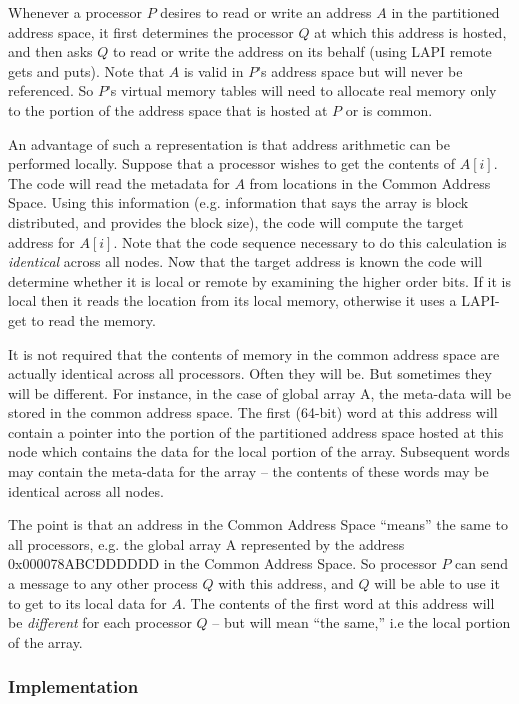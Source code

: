 Whenever a processor $P$ desires to read or write an address  $A$ in the 
partitioned address space, it first determines the processor $Q$ at which 
this address is hosted, and then asks $Q$ to read or write the address on 
its behalf (using LAPI remote gets and puts). Note that  $A$ is valid in 
$P$'s address space but will never be referenced. So $P$'s virtual memory 
tables will need to allocate real memory only to the portion of the 
address space that is hosted at $P$ or is common.

An advantage of such a representation is that address arithmetic can be 
performed locally. Suppose that a processor wishes to get the contents 
of $A[i]$. The code will read the metadata for $A$ from locations in the  
Common Address Space. Using this information (e.g.{} information that says 
the array is block distributed, and provides the block size), the code 
will compute the target address for $A[i]$. Note that the code sequence 
necessary to do this calculation is {\em identical} across all nodes. Now 
that the target address is known the code will determine whether it is 
local or remote by examining the higher order bits. If it is local then 
it reads the location from its local memory, otherwise it uses a 
LAPI-get to read the memory.

It is not required that the contents of memory in the common address
space are actually identical across all processors.  Often they will
be. But sometimes they will be different. For instance, in the case of
global array A, the meta-data will be stored in the common
address space. The first (64-bit) word at this address will contain a pointer
into the portion of the partitioned address space hosted at this node
which contains the data for the local portion of the array.
Subsequent words may contain the meta-data for the array -- the
contents of these words may be identical across all nodes.

The point is that an address in the Common Address Space ``means'' the 
same to all processors, e.g. the global array A represented by the 
address 0x000078ABCDDDDDD in the Common Address Space. So processor $P$ 
can send a message to any other process $Q$ with this address, and $Q$ will 
be able to use it to get to its local data for $A$. The contents of the 
first word at this address will be {\em different} for each processor $Q$ -- 
but will mean ``the same,'' i.e the local portion of the array.

\subsubsection {Implementation}

